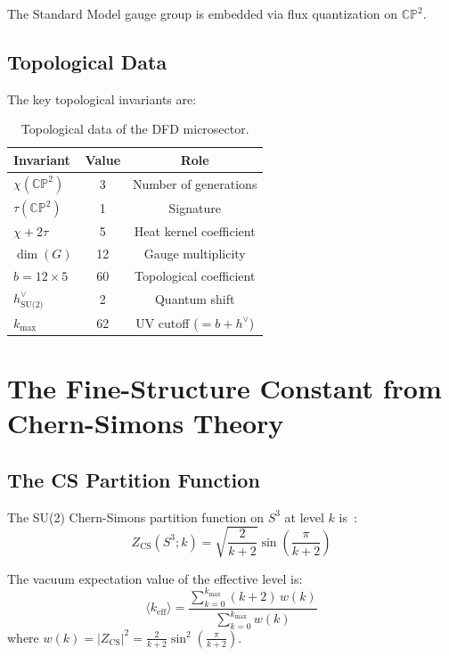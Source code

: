 \documentclass[11pt,a4paper]{article}
\newcommand{\CP}{\mathbb{CP}}
\begin{document}
The Standard Model gauge group is embedded via flux quantization on $\CP^2$.

\subsection{Topological Data}

The key topological invariants are:

\begin{table}[h]
\centering
\begin{tabular}{lcc}
\toprule
Invariant & Value & Role \\
\midrule
$\chi(\CP^2)$ & 3 & Number of generations \\
$\tau(\CP^2)$ & 1 & Signature \\
$\chi + 2\tau$ & 5 & Heat kernel coefficient \\
$\dim(G)$ & 12 & Gauge multiplicity \\
$b = 12 \times 5$ & 60 & Topological coefficient \\
$h^\vee_{\text{SU(2)}}$ & 2 & Quantum shift \\
$k_{\max}$ & 62 & UV cutoff ($= b + h^\vee$) \\
\bottomrule
\end{tabular}
\caption{Topological data of the DFD microsector.}
\end{table}

\section{The Fine-Structure Constant from Chern-Simons Theory}

\subsection{The CS Partition Function}

The SU(2) Chern-Simons partition function on $S^3$ at level $k$ is~\cite{Witten1989}:
\begin{equation}
Z_{\text{CS}}(S^3; k) = \sqrt{\frac{2}{k+2}} \sin\left(\frac{\pi}{k+2}\right)
\end{equation}

The vacuum expectation value of the effective level is:
\begin{equation}
\langle k_{\text{eff}} \rangle = \frac{\sum_{k=0}^{k_{\max}} (k+2) \, w(k)}{\sum_{k=0}^{k_{\max}} w(k)}
\end{equation}
where $w(k) = |Z_{\text{CS}}|^2 = \frac{2}{k+2} \sin^2\left(\frac{\pi}{k+2}\right)$.
\end{document}
